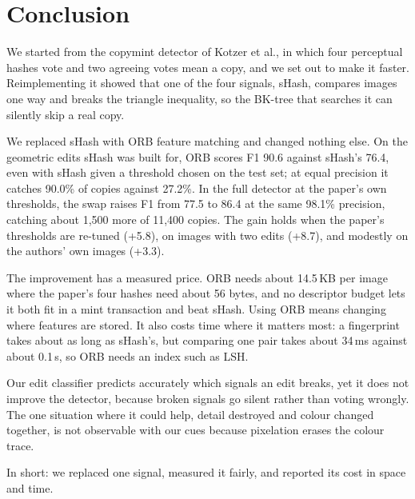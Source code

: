 \section{Conclusion}

We started from the copymint detector of Kotzer et al., in which four perceptual hashes vote and two
agreeing votes mean a copy, and we set out to make it faster. Reimplementing it showed that one
of the four signals, sHash, compares images one way and breaks the triangle inequality, so the
BK-tree that searches it can silently skip a real copy.

We replaced sHash with ORB feature matching and changed nothing else. On the geometric edits
sHash was built for, ORB scores F1 90.6 against sHash's 76.4, even with sHash given a
threshold chosen on the test set; at equal precision it catches 90.0\% of copies against
27.2\%. In the full detector at the paper's own thresholds, the swap raises F1 from
77.5 to 86.4 at the same 98.1\% precision, catching about 1,500 more of 11,400 copies. The
gain holds when the paper's thresholds are re-tuned (+5.8), on images with two edits (+8.7),
and modestly on the authors' own images (+3.3).

The improvement has a measured price. ORB needs about 14.5\,KB per image where the paper's
four hashes need about 56 bytes, and no descriptor budget lets it both fit in a mint
transaction and beat sHash. Using ORB means changing where features are stored. It also
costs time where it matters most: a fingerprint takes about as long as sHash's, but comparing
one pair takes about 34\,ms against about 0.1\,\textmu s, so ORB needs an index such as LSH.

Our edit classifier predicts accurately which signals an edit breaks, yet it does not improve
the detector, because broken signals go silent rather than voting wrongly. The one situation
where it could help, detail destroyed and colour changed together, is not observable with our
cues because pixelation erases the colour trace.

In short: we replaced one signal, measured it fairly, and reported its cost in space and time.
